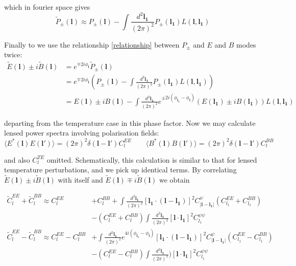 \documentclass[a4paper,10pt]{article}
\renewcommand{\v}[1]{\mathbf{#1}}
\newcommand{\finttwo}[1]{\int \frac{d^2 \v{#1}}{(2\pi)^2}}
\begin{document}
which in fourier space gives
\begin{equation}
\tilde{P}_{\pm}(\v{l}) \approx P_{\pm}(\v{l}) - \finttwo{l_1} P_{\pm}(\v{l_1})L(\v{l},\v{l_1})
\end{equation}

Finally to we use the relationship \ref{relationship} between $P_\pm$ and $E$ and $B$ modes twice:
\begin{equation}\begin{split}
\tilde{E}(\v{l})\pm i\tilde{B}(\v{l}) &= e^{\mp 2i\phi_\v{l}}\tilde{P}_{\pm}(\v{l})\\
&=e^{\mp 2i\phi_\v{l}}(P_{\pm}(\v{l}) - \finttwo{l_1} P_{\pm}(\v{l_1})L(\v{l},\v{l_1}))\\
&=E(\v{l})\pm iB(\v{l})-\finttwo{l_1} e^{\pm 2i(\phi_\v{l_1}-\phi_\v{l})}(E(\v{l_1})\pm iB(\v{l_1}))L(\v{l},\v{l_1})
\label{lensedEBmodes}
\end{split}\end{equation}



departing from the temperature case in this phase factor. Now we may calculate lensed power spectra involving polarisation fields:
\begin{equation}
\langle E^*(\v{l})E(\v{l}')\rangle = (2\pi)^2\delta(\v{l}-\v{l}')C_l^{EE} \qquad \langle B^*(\v{l})B(\v{l}')\rangle = (2\pi)^2\delta(\v{l}-\v{l}')C_l^{BB}
\end{equation}

and also $C_l^{TE}$ omitted. Schematically, this calculation is similar to that for lensed temperature perturbations, and we pick up identical terms. By correlating $\tilde{E}(\v{l})\pm i\tilde{B}(\v{l})$ with itself and $\tilde{E}(\v{l})\mp i\tilde{B}(\v{l})$ we obtain

\begin{equation}\begin{split}
\tilde{C}_l^{EE}+\tilde{C}_l^{BB} \approx C_l^{EE}&+C_l^{BB}+\finttwo{l_1}[ \v{l_1}\cdot(\v{l}-\v{l_1})]^2 C^\psi_{|\v{l}-\v{l_1}|}(C_{l_1}^{EE}+C_{l_1}^{BB}) \\
&- (C_{l}^{EE}+C_{l}^{BB})\finttwo{l_1} [\v{l}\cdot\v{l_1}]^2C_{l_1}^{\psi\psi}\\
\tilde{C}_l^{EE}-\tilde{C}_l^{BB} \approx C_l^{EE}-C_l^{BB}&+\finttwo{l_1}e^{4i(\phi_{\v{l_1}}-\phi_\v{l})}[ \v{l_1}\cdot(\v{l}-\v{l_1})]^2 C^\psi_{|\v{l}-\v{l_1}|}(C_{l_1}^{EE}-C_{l_1}^{BB})\\
&- (C_{l}^{EE}-C_{l}^{BB})\finttwo{l_1} )[\v{l}\cdot\v{l_1}]^2C_{l_1}^{\psi\psi}
\end{split}\end{equation}
\end{document}
